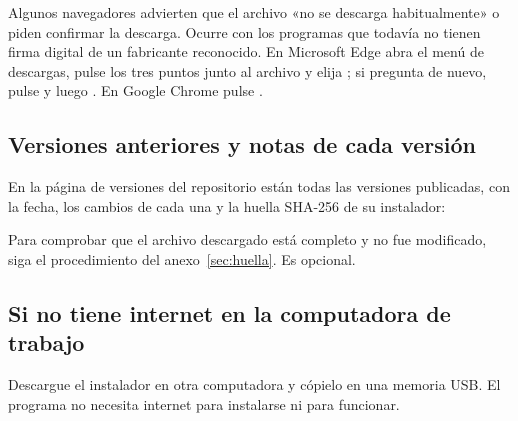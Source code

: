 
Algunos navegadores advierten que el archivo «no se descarga habitualmente» o piden confirmar la descarga. Ocurre con
los programas que todavía no tienen firma digital de un fabricante reconocido. En Microsoft Edge abra el menú de
descargas, pulse los tres puntos junto al archivo y elija ; si pregunta de nuevo, pulse
 y luego . En Google Chrome pulse .

\subsection{Versiones anteriores y notas de cada versión}

En la página de versiones del repositorio están todas las versiones publicadas, con la fecha, los cambios de cada una y
la huella SHA-256 de su instalador:

\begin{center}
	\href{\enlaceversiones}{\ruta{\enlaceversiones}}
\end{center}

Para comprobar que el archivo descargado está completo y no fue modificado, siga el procedimiento del
anexo~\ref{sec:huella}. Es opcional.

\subsection{Si no tiene internet en la computadora de trabajo}

Descargue el instalador en otra computadora y cópielo en una memoria USB. El programa no necesita internet para
instalarse ni para funcionar.
